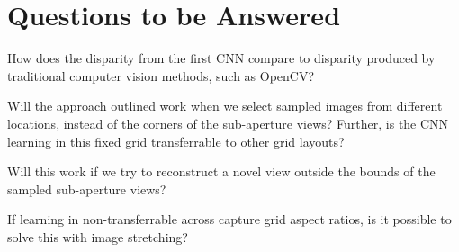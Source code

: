 \documentclass[10pt,twocolumn,letterpaper]{article}
\begin{document}
\begin{tabular}{|c c c c|}
\end{tabular}

\section{Questions to be Answered}

How does the disparity from the first CNN compare to disparity produced 
by traditional computer vision methods, such as OpenCV?

Will the approach outlined work when we select sampled images from different locations, instead 
of the corners of the sub-aperture views? Further, is the CNN learning in this fixed grid transferrable
to other grid layouts?

Will this work if we try to reconstruct a novel view outside the bounds of the sampled sub-aperture views?

If learning in non-transferrable across capture grid aspect ratios, is it possible to solve this with
image stretching?

{\small


}
\end{document}

